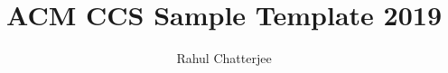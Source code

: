\documentclass[sigconf]{acmart}
\begin{document}
\fancyhead{}
\def\thetitle{ACM CCS Sample Template 2019}
\title{\thetitle}

\author{Rahul Chatterjee}

\date{}



\maketitle
{}










\appendix

\end{document}
